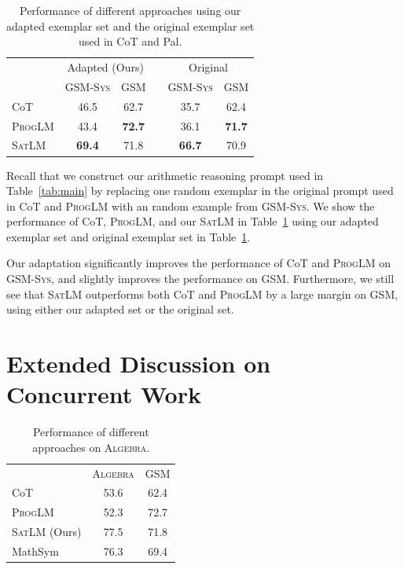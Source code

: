 \documentclass{article}
\theoremstyle{definition}
\newcommand{\gsm}{\textsc{GSM}}
\newcommand{\gsmsys}{\textsc{GSM-Sys}}
\newcommand{\algebra}{\textsc{Algebra}}
\newcommand{\satlm}{\textsc{SatLM}}
\newcommand{\pallm}{\textsc{ProgLM}}
\begin{document}
\begin{table}[h]
    \caption{Performance of different approaches using our adapted exemplar set and the original exemplar set used in {\sc CoT} and {\sc Pal}.}
    \centering
    \footnotesize
    \begin{tabular}{lccccc}
    \toprule
        & \multicolumn{2}{c}{\sc Adapted (Ours)} &  & \multicolumn{2}{c}{
        \sc Original} \\
        & \gsmsys{} & \gsm{} &  & \gsmsys{} & \gsm{}\\
        \cmidrule{2-3} \cmidrule{5-6}
    \sc CoT  & 46.5 & 62.7 &  & 35.7 & 62.4 \\
    \pallm{} & 43.4  & \bf 72.7 & & 36.1& \bf 71.7 \\
    \satlm{} & \bf 69.4 & 71.8 & & \bf 66.7& 70.9 \\
    \bottomrule
    \end{tabular}
    \label{tab:official_cot}
\end{table}

Recall that we construct our arithmetic reasoning prompt used in Table~\ref{tab:main} by replacing one random exemplar in the original prompt used in {\sc CoT} and \pallm{} with an random example from \gsmsys{}. We show the performance of {\sc CoT}, \pallm{}, and our \satlm{} in Table~\ref{tab:official_cot} using our adapted exemplar set and original exemplar set in Table~\ref{tab:official_cot}.

Our adaptation significantly improves the performance of {\sc CoT} and \pallm{} on \gsmsys{}, and slightly improves the performance on \gsm{}. Furthermore, we still see that \satlm{} outperforms both {\sc CoT} and \pallm{} by a large margin on \gsm{}, using either our adapted set or the original set.




\section{Extended Discussion on Concurrent Work}
\label{app:discuss_concurrent}

\begin{table}[h]
    \caption{Performance of different approaches on \algebra{}.}
    \centering
    \footnotesize
    \begin{tabular}{lcc}
    \toprule
        & \algebra{} & \gsm{}\\
        \cmidrule{2-3}
    \sc CoT  & 53.6 & 62.4  \\
    \pallm{} & 52.3  &  72.7 \\
    \satlm{} (Ours) & 77.5 &  71.8 \\
    {\sc MathSym} \citep{gsmsat} & 76.3 & 69.4 \\
    \bottomrule
    \end{tabular}
    \label{tab:disc_concurrent}
\end{table}
\end{document}
